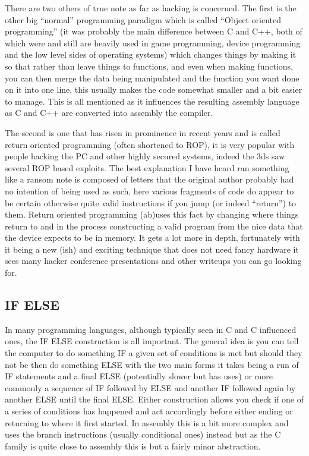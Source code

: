 \documentclass[
]{book}
\begin{document}
There are two others of true note as far as hacking is concerned. The first is the other big ``normal'' programming paradigm which is called ``Object oriented programming'' (it was probably the main difference between C and C++, both of which were and still are heavily used in game programming, device programming and the low level sides of operating systems) which changes things by making it so that rather than leave things to functions, and even when making functions, you can then merge the data being manipulated and the function you want done on it into one line, this usually makes the code somewhat smaller and a bit easier to manage. This is all mentioned as it influences the resulting assembly language as C and C++ are converted into assembly the compiler.

The second is one that has risen in prominence in recent years and is called return oriented programming (often shortened to ROP), it is very popular with people hacking the PC and other highly secured systems, indeed the 3ds saw several ROP based exploits. The best explanation I have heard ran something like a ransom note is composed of letters that the original author probably had no intention of being used as such, here various fragments of code do appear to be certain otherwise quite valid instructions if you jump (or indeed ``return'') to them. Return oriented programming (ab)uses this fact by changing where things return to and in the process constructing a valid program from the nice data that the device expects to be in memory. It gets a lot more in depth, fortunately with it being a new (ish) and exciting technique that does not need fancy hardware it sees many hacker conference presentations and other writeups you can go looking for.

\hypertarget{if-else}{%
\subsection{IF ELSE}\label{if-else}}

In many programming languages, although typically seen in C and C influenced ones, the IF ELSE construction is all important. The general idea is you can tell the computer to do something IF a given set of conditions is met but should they not be then do something ELSE with the two main forms it takes being a run of IF statements and a final ELSE (potentially slower but has uses) or more commonly a sequence of IF followed by ELSE and another IF followed again by another ELSE until the final ELSE. Either construction allows you check if one of a series of conditions has happened and act accordingly before either ending or returning to where it first started. In assembly this is a bit more complex and uses the branch instructions (usually conditional ones) instead but as the C family is quite close to assembly this is but a fairly minor abstraction.
\end{document}
